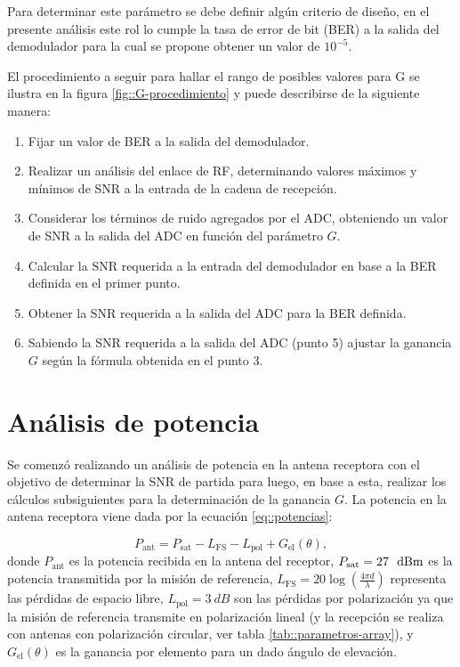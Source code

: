 \documentclass[../../main.tex]{subfiles}
\begin{document}
Para determinar este parámetro se debe definir algún criterio de diseño, en el presente análisis este rol lo cumple la tasa de error de bit (BER) a la salida del demodulador para la cual se propone obtener un valor de $10^{-5}$. 

El procedimiento a seguir para hallar el rango de posibles valores para G se ilustra en la figura \ref{fig::G-procedimiento} y puede describirse de la siguiente manera:
\begin{enumerate}
    \item Fijar un valor de BER a la salida del demodulador.
    \item Realizar un análisis del enlace de RF, determinando valores máximos y mínimos de SNR a la entrada de la cadena de recepción.
    \item Considerar los términos de ruido agregados por el ADC, obteniendo un valor de SNR a la salida del ADC en función del parámetro $G$.
    \item Calcular la SNR requerida a la entrada del demodulador en base a la BER definida en el primer punto.
    \item Obtener la SNR requerida a la salida del ADC para la BER definida.
    \item Sabiendo la SNR requerida a la salida del ADC (punto 5) ajustar la ganancia $G$ según la fórmula obtenida en el punto 3.
\end{enumerate}


\section{Análisis de potencia}\label{sec::analisis-potencia}
Se comenzó realizando un análisis de potencia en la antena receptora con el objetivo de determinar la SNR de partida para luego, en base a esta, realizar los cálculos subsiguientes para la determinación de la ganancia $G$. La potencia en la antena receptora viene dada por la ecuación \ref{eq::potencias}:

\begin{equation}
    P_\textrm{ant} = P_\textrm{sat} - L_\textrm{FS} - L_\textrm{pol} + G_\textrm{el} (\theta),
    \label{eq::potencias}
\end{equation}
donde $P_\textrm{ant}$ es la potencia recibida en la antena del receptor, 
$P_\textrm{sat} = 27~~\textrm{dBm}$ es la potencia transmitida por la misión de referencia, $L_\textrm{FS} = 20 \log \left(\frac{4 \pi d}{\lambda}\right)$ representa las pérdidas de espacio libre, $L_\textrm{pol} = 3~dB$
son las pérdidas por polarización ya que la misión de referencia transmite en polarización lineal (y la recepción se realiza con antenas con polarización circular, ver tabla \ref{tab::parametros-array}), y $G_\textrm{el} (\theta)$ es la ganancia por elemento para un dado ángulo de elevación.
 
\end{document}
